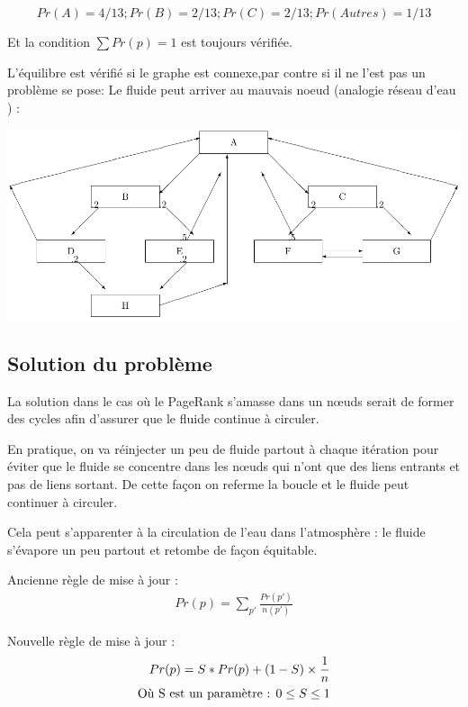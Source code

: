 	$$Pr(A) = 4/13 ; Pr(B) = 2/13 ; Pr(C) = 2/13 ; Pr(Autres) = 1/13$$
 
Et la condition $\sum Pr(p) = 1$ est toujours vérifiée.
 
 L'équilibre est vérifié si le graphe est connexe,par contre si il ne l'est pas un problème se pose: Le fluide peut arriver au mauvais noeud (analogie réseau d'eau )  :

\includegraphics[scale=0.8]{images/24_Nconnexe.pdf}

\subsection*{Solution du problème}
	La solution dans le cas où le PageRank s'amasse dans un nœuds serait de former des cycles afin d'assurer que le fluide continue à circuler.
	
 	En pratique, on va réinjecter un peu de fluide partout à chaque itération pour éviter que le fluide se concentre dans les nœuds qui n'ont que des liens entrants et pas de liens sortant. De cette façon on referme la boucle et le fluide peut continuer à circuler.
 	
 	Cela peut s'apparenter à la circulation de l'eau dans l'atmosphère : le fluide s'évapore un peu partout et retombe de façon équitable.

	Ancienne règle de mise à jour :
	\begin{align*}
	Pr(p) =  \sum_ {p'}\frac{Pr(p')}{n(p')}
	\end{align*}
	
 	Nouvelle règle de mise à jour : \\
	\begin{align*}
         Pr(p) = S*Pr(p) + (1-S)  \times \frac{1}{n} \\
	 \text{Où S est un paramètre : $ 0 \le S \le 1 $} 
	\end{align*}
        
